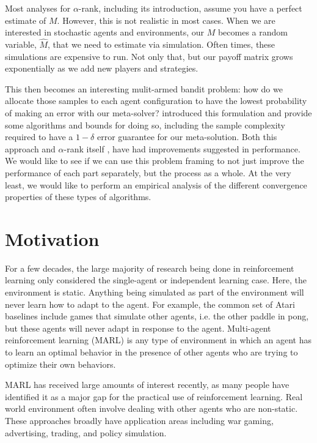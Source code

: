 \documentclass{article}
\begin{document}
Most analyses for $\alpha$-rank, including its introduction, assume you have a
perfect estimate of $M$. However, this is not realistic in most cases. When we
are interested in stochastic agents and environments, our $M$ becomes a random
variable, $\hat{M}$, that we need to estimate via simulation. Often times, these
simulations are expensive to run. Not only that, but our payoff matrix grows
exponentially as we add new players and strategies.

This then becomes an interesting mulit-armed bandit problem: how do we allocate
those samples to each agent configuration to have the lowest probability of
making an error with our meta-solver? \cite{goodone} introduced this formulation
and provide some algorithms and bounds for doing so, including the sample
complexity required to have a $1 - \delta$ error guarantee for our
meta-solution. Both this approach \cite{IM} and $\alpha$-rank itself
\cite{alphaalpha}, have had improvements suggested in performance. We would like to
see if we can use this problem framing to not just improve the performance of
each part separately, but the process as a whole. At the very least, we would
like to perform an empirical analysis of the different convergence properties of
these types of algorithms.

\section{Motivation}
For a few decades, the large majority of research being done in reinforcement
learning only considered the single-agent or independent learning case. Here, the environment is
static. Anything being simulated as part of the environment will never learn how
to adapt to the agent. For example, the common set of Atari baselines
\cite{atari} include games that simulate other agents, i.e. the other paddle in
pong, but these agents will never adapt in response to the agent. Multi-agent
reinforcement learning (MARL) is any type of environment in which an agent has to learn
an optimal behavior in the presence of other agents who are trying to optimize
their own behaviors. 

MARL has received large amounts of interest recently, as many people have
identified it as a major gap for the practical use of reinforcement learning.
Real world environment often involve dealing with other agents who are
non-static. These approaches broadly have application areas including war gaming,
advertising, trading, and policy simulation.
\end{document}
